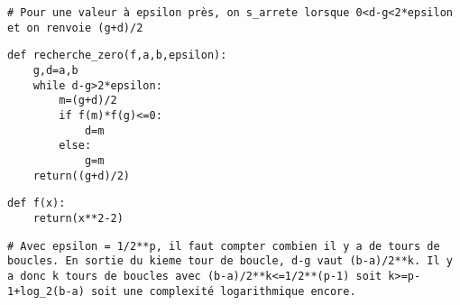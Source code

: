 



\begin{lstlisting}
# Pour une valeur à epsilon près, on s_arrete lorsque 0<d-g<2*epsilon et on renvoie (g+d)/2
\end{lstlisting}
	


\begin{lstlisting}
def recherche_zero(f,a,b,epsilon):
    g,d=a,b
    while d-g>2*epsilon:
        m=(g+d)/2
        if f(m)*f(g)<=0:
            d=m
        else:
            g=m
    return((g+d)/2)

\end{lstlisting}
	


\begin{lstlisting}
def f(x):
    return(x**2-2)
\end{lstlisting}
	



\begin{lstlisting}
# Avec epsilon = 1/2**p, il faut compter combien il y a de tours de boucles. En sortie du kieme tour de boucle, d-g vaut (b-a)/2**k. Il y a donc k tours de boucles avec (b-a)/2**k<=1/2**(p-1) soit k>=p-1+log_2(b-a) soit une complexité logarithmique encore.
\end{lstlisting}